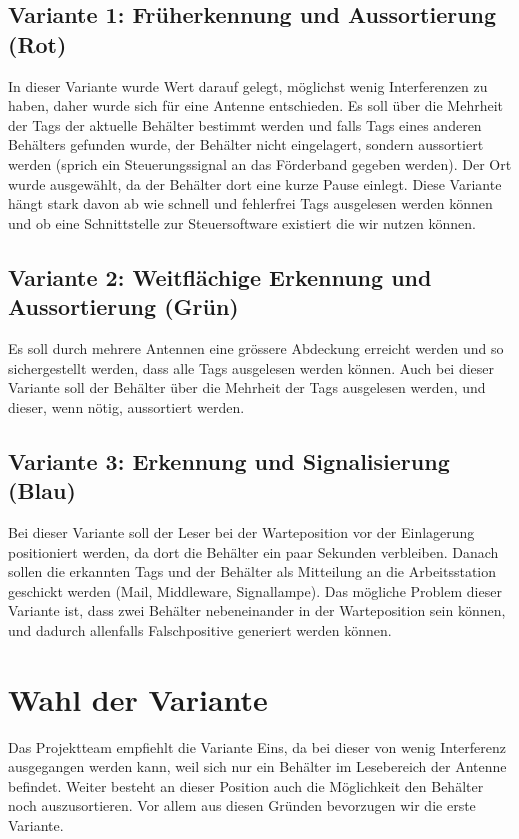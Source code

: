 \subsection{Variante 1: Früherkennung und Aussortierung (Rot)}
In dieser Variante wurde Wert darauf gelegt, möglichst wenig Interferenzen zu haben, daher wurde sich für eine Antenne entschieden. Es soll über die Mehrheit der Tags der aktuelle Behälter bestimmt werden und falls Tags eines anderen Behälters gefunden wurde, der Behälter nicht eingelagert, sondern aussortiert werden (sprich ein Steuerungssignal an das Förderband gegeben werden). Der Ort wurde ausgewählt, da der Behälter dort eine kurze Pause einlegt. Diese Variante hängt stark davon ab wie schnell und fehlerfrei Tags ausgelesen werden können und ob eine Schnittstelle zur Steuersoftware existiert die wir nutzen können.

\subsection{Variante 2: Weitflächige Erkennung und Aussortierung (Grün)}
Es soll durch mehrere Antennen eine grössere Abdeckung erreicht werden und so sichergestellt werden, dass alle Tags ausgelesen werden können. Auch bei dieser Variante soll der Behälter über die Mehrheit der Tags ausgelesen werden, und dieser, wenn nötig, aussortiert werden.

\subsection{Variante 3: Erkennung und Signalisierung (Blau)}
Bei dieser Variante soll der Leser bei der Warteposition vor der Einlagerung positioniert werden, da dort die Behälter ein paar Sekunden verbleiben. Danach sollen die erkannten Tags und der Behälter als Mitteilung an die Arbeitsstation geschickt werden (Mail, Middleware, Signallampe). Das mögliche Problem dieser Variante ist, dass zwei Behälter nebeneinander in der Warteposition sein können, und dadurch allenfalls Falschpositive generiert werden können.

\section{Wahl der Variante}

Das Projektteam empfiehlt die Variante Eins, da bei dieser von wenig Interferenz ausgegangen werden kann, weil sich nur ein Behälter im Lesebereich der Antenne befindet. Weiter besteht an dieser Position auch die Möglichkeit den Behälter noch auszusortieren. Vor allem aus diesen Gründen bevorzugen wir die erste Variante.


